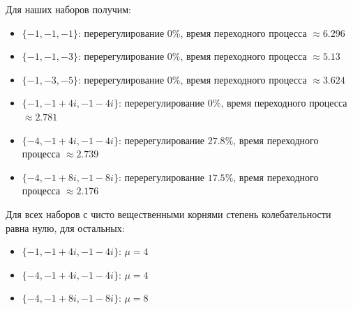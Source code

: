 Для наших наборов получим:

\begin{itemize}
\setlength{\itemsep}{-1ex}
   \item{\begin{flushleft} $\lbrace -1,-1,-1\rbrace$: перерегулирование $0\%$, время переходного процесса $\approx 6.296$ \end{flushleft}}
   \item{\begin{flushleft} $\lbrace -1,-1,-3\rbrace$: перерегулирование $0\%$, время переходного процесса $\approx 5.13$ \end{flushleft}}
   \item{\begin{flushleft} $\lbrace -1,-3,-5\rbrace$: перерегулирование $0\%$, время переходного процесса $\approx 3.624$ \end{flushleft}}
   \item{\begin{flushleft} $\lbrace -1,-1+4i,-1-4i\rbrace$: перерегулирование $0\%$, время переходного процесса $\approx 2.781$ \end{flushleft}}
   \item{\begin{flushleft} $\lbrace -4,-1+4i,-1-4i\rbrace$: перерегулирование $27.8\%$, время переходного процесса $\approx 2.739$ \end{flushleft}}
   \item{\begin{flushleft} $\lbrace -4,-1+8i,-1-8i\rbrace$: перерегулирование $17.5\%$, время переходного процесса $\approx 2.176$ \end{flushleft}}
\end{itemize}


Для всех наборов с чисто вещественными корнями степень колебательности равна нулю, для остальных:


\begin{itemize}
\setlength{\itemsep}{-1ex}
   \item{\begin{flushleft} $\lbrace -1,-1+4i,-1-4i\rbrace$: $\mu =4$ \end{flushleft}}
   \item{\begin{flushleft} $\lbrace -4,-1+4i,-1-4i\rbrace$: $\mu =4$ \end{flushleft}}
   \item{\begin{flushleft} $\lbrace -4,-1+8i,-1-8i\rbrace$: $\mu =8$ \end{flushleft}}
\end{itemize}


